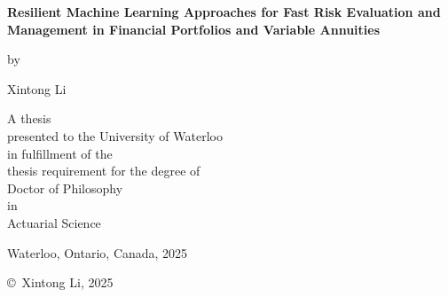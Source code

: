 \pagestyle{empty}

\begin{titlepage}
        \begin{center}
        \vspace*{1.0cm}

        \Huge
        {\bf Resilient Machine Learning Approaches for Fast Risk Evaluation and Management in Financial Portfolios and Variable Annuities}

        \vspace*{1.0cm}

        \normalsize
        by \\

        \vspace*{1.0cm}

        \Large
        Xintong Li \\

        \vspace*{3.0cm}

        \normalsize
        A thesis \\
        presented to the University of Waterloo \\ 
        in fulfillment of the \\
        thesis requirement for the degree of \\
        Doctor of Philosophy \\
        in \\
        Actuarial Science \\

        \vspace*{2.0cm}

        Waterloo, Ontario, Canada, 2025 \\

        \vspace*{1.0cm}

        \copyright\ Xintong Li, 2025 \\
        \end{center}
\end{titlepage}

\pagestyle{plain}
\setcounter{page}{2}

